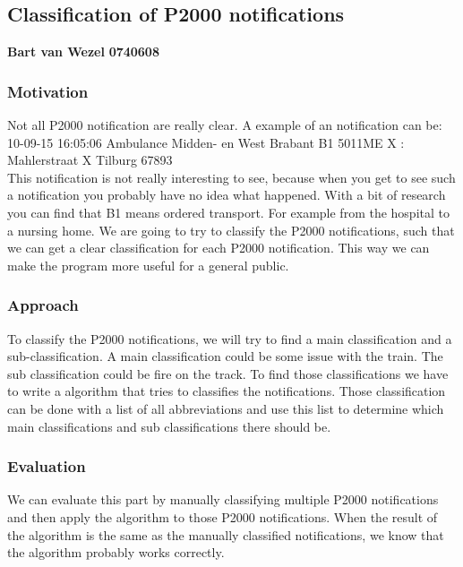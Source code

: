 \subsection{Classification of P2000 notifications }
\textbf{Bart van Wezel}  \indent \textbf{0740608} 

\subsubsection*{Motivation}
Not all P2000 notification are really clear. A example of an notification can be: \\ 
10-09-15	16:05:06	Ambulance	Midden- en West Brabant	B1 5011ME X : Mahlerstraat X Tilburg 67893  \\
This notification is not really interesting to see, because when you get to see such a notification you probably have no idea what happened. 
With a bit of research you can find that B1 means ordered transport. For example from the hospital to a nursing home. 
We are going to try to classify the P2000 notifications, such that we can get a clear classification for each P2000 notification.
This way we can make the program more useful for a general public. 

\subsubsection*{Approach}
To classify the P2000 notifications, we will try to find a main classification and a sub-classification. 
A main classification could be some issue with the train. 
The sub classification could be fire on the track. 
To find those classifications we have to write a algorithm that tries to classifies the notifications. 
Those classification can be done with a list of all abbreviations and use this list to determine which main classifications and sub classifications there should be. 

\subsubsection*{Evaluation }
We can evaluate this part by manually classifying  multiple P2000 notifications and then apply the algorithm to those P2000 notifications.
When the result of the algorithm is the same as the manually classified notifications, we know that the algorithm probably works correctly.